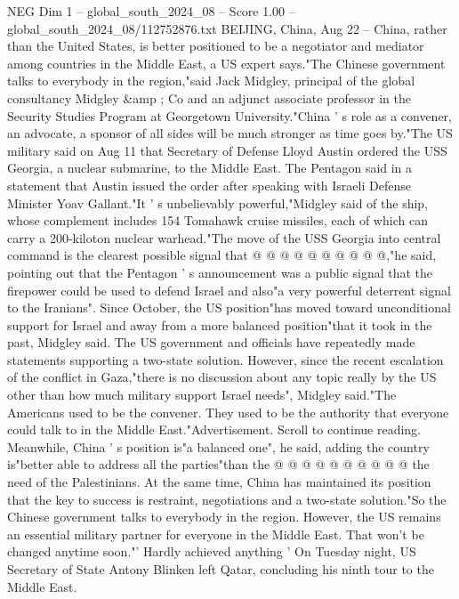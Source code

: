 \begin{textsample}{NEG Dim 1 – global\_south\_2024\_08 – Score 1.00 – global\_south\_2024\_08/112752876.txt}  \label{ex:f1_neg_121}
BEIJING, China, Aug 22 -- China, rather than the United States, is better positioned to be a negotiator and mediator among countries in the Middle East, a US expert says."The Chinese government talks to everybody in the region,"said Jack Midgley, principal of the global consultancy Midgley \&amp ; Co and an adjunct associate professor in the Security Studies Program at Georgetown University."China ' s role as a convener, an advocate, a sponsor of all sides will be much stronger as time goes by."The US military said on Aug 11 that Secretary of Defense Lloyd Austin ordered the USS Georgia, a nuclear submarine, to the Middle East.
The Pentagon said in a statement that Austin issued the order after speaking with Israeli Defense Minister Yoav Gallant."It ' s unbelievably powerful,"Midgley said of the ship, whose complement includes 154 Tomahawk cruise missiles, each of which can carry a 200-kiloton nuclear warhead."The move of the USS Georgia into central command is the clearest possible signal that @ @ @ @ @ @ @ @ @ @,"he said, pointing out that the Pentagon ' s announcement was a public signal that the firepower could be used to defend Israel and also"a very powerful deterrent signal to the Iranians".
Since October, the US position"has moved toward unconditional support for Israel and away from a more balanced position"that it took in the past, Midgley said.
The US government and officials have repeatedly made statements supporting a two-state solution.
However, since the recent escalation of the conflict in Gaza,"there is no discussion about any topic really by the US other than how much military support Israel needs", Midgley said."The Americans used to be the convener.
They used to be the authority that everyone could talk to in the Middle East."Advertisement.
Scroll to continue reading.
Meanwhile, China ' s position is"a balanced one", he said, adding the country is"better able to address all the parties"than the @ @ @ @ @ @ @ @ @ @ the need of the Palestinians.
At the same time, China has maintained its position that the key to success is restraint, negotiations and a two-state solution."So the Chinese government talks to everybody in the region.
However, the US remains an essential military partner for everyone in the Middle East.
That won't be changed anytime soon."' Hardly achieved anything ' On Tuesday night, US Secretary of State Antony Blinken left Qatar, concluding his ninth tour to the Middle East.

\end{textsample}
